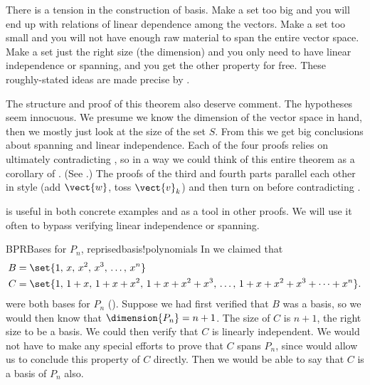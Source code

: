 %
There is a tension in the construction of basis.  Make a set too big and you will end up with relations of linear dependence among the vectors.  Make a set too small and you will not have enough raw material to span the entire vector space.  Make a set just the right size (the dimension) and you only need to have linear independence or spanning, and you get the other property for free.  These roughly-stated ideas are made precise by .\par
%
The structure and proof of this theorem also deserve comment.  The hypotheses seem innocuous.  We presume we know the dimension of the vector space in hand, then we mostly just look at the size of the set $S$. From this we get big conclusions about spanning and linear independence.  Each of the four proofs relies on ultimately contradicting , so in a way we could think of this entire theorem as a corollary of .    (See .) The proofs of the third and fourth parts parallel each other in style (add $\vect{w}$, toss $\vect{v}_k$) and then turn on  before contradicting .\par
%
 is useful in both concrete examples and as a tool in other proofs.  We will use it often to bypass verifying linear independence or spanning.
%
\begin{example}{BPR}{Bases for $P_n$, reprised}{basis!polynomials}
%
In  we claimed that
\begin{align*}
B&=\set{1,\,x,\,x^2,\,x^3,\,\ldots,\,x^n}\\
C&=\set{1,\,1+x,\,1+x+x^2,\,1+x+x^2+x^3,\,\ldots,\,1+x+x^2+x^3+\cdots+x^n}.
\end{align*}
%
were both bases for $P_n$ ().  Suppose we had first verified that $B$ was a basis, so we would then know that $\dimension{P_n}=n+1$.  The size of $C$ is $n+1$, the right size to be a basis.  We could then verify that $C$ is linearly independent.  We would not have to make any special efforts to prove that $C$ spans $P_n$, since  would allow us to conclude this property of $C$ directly.  Then we would be able to say that $C$ is a basis of $P_n$ also.
%
\end{example}
%
%
